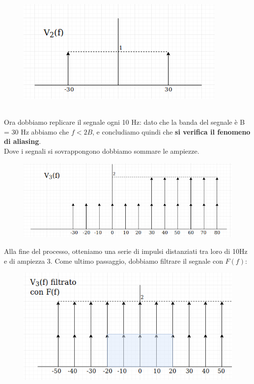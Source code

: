\documentclass[12pt,a4paper]{article}
\begin{document}
	\begin{figure}[h!]
		\centering
		\includegraphics[scale=0.5]{./images/fourier54_5.png}
	\end{figure}
	\\Ora dobbiamo replicare il segnale ogni 10 Hz: dato che la banda del segnale è B = 30 Hz abbiamo che $f < 2B$, e concludiamo quindi che \textbf{si verifica il fenomeno di aliasing}.\\Dove i segnali si sovrappongono dobbiamo sommare le ampiezze.
	\begin{figure}[h!]
		\centering
		\includegraphics[scale=0.4]{./images/fourier54_6.png}
	\end{figure}
	\newpage Alla fine del processo, otteniamo una serie di impulsi distanziati tra loro di 10Hz e di ampiezza 3. Come ultimo passaggio, dobbiamo filtrare il segnale con $F(f)$:
	\begin{figure}[h!]
		\centering
		\includegraphics[scale=0.4]{./images/fourier54_7.png}
	\end{figure}
\end{document}

